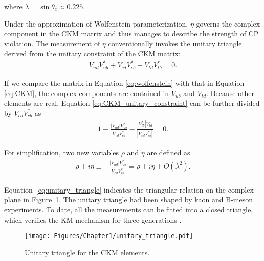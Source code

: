 \noindent
where $\lambda = \sin{\theta_c} \approx 0.225$. 

Under the approximation of Wolfenstein parameterization, $\eta$ governs the complex component in the CKM matrix and thus manages to describe the strength of CP violation. The measurement of $\eta$ conventionally invokes the unitary triangle derived from the unitary constraint of the CKM matrix:
%
\vspace{1em}
\begin{align}
V_{ud}V_{ub}^\ast + V_{cd} V_{cb}^\ast + V_{td} V_{tb}^\ast = 0.
\label{eq:CKM_unitary_constraint}
\end{align}

If we compare the matrix in Equation \ref{eq:wolfenstein} with that in Equation \ref{eq:CKM}, the complex components are contained in $V_{ub}$ and $V_{td}$. Because other elements are real, Equation \ref{eq:CKM_unitary_constraint} can be further divided by $V_{cd} V_{cb}^{\ast}$ as
%
\begin{align}
1 - \frac{|V_{ud}|V_{ub}^{\ast}}{|V_{cd}V_{cb}^{\ast}|} - \frac{|V_{tb}^{\ast}|V_{td}}{|V_{cd}V_{cb}^{\ast}|} = 0.
\label{eq:unitary_triangle}
\end{align}

\noindent
For simplification, two new variables $\overline{\rho}$ and $\overline{\eta}$ are defined as
%
\vspace{1em}
\begin{align*}
\overline{\rho} + i \overline{\eta} \equiv -\frac{|V_{ud}|V_{ub}^{\ast}}{|V_{cd}V_{cb}^{\ast}|} = \rho + i \eta + \mathit{O}(\lambda^2).
\end{align*}


Equation~\ref{eq:unitary_triangle} indicates the triangular relation on the complex plane in Figure~\ref{fig:unitary_triangle}. The unitary triangle had been shaped by kaon and B-meson experiments. To date, all the measurements can be fitted into a closed triangle, which verifies the KM mechanism for three generations \parencite{PDG20}.

\begin{figure}[h]
\begin{center}
\captionsetup{width=.95\linewidth}
\texttt{[image: Figures/Chapter1/unitary\_triangle.pdf]}
\caption{Unitary triangle for the CKM elements.}
\label{fig:unitary_triangle}
\end{center}
\end{figure}

